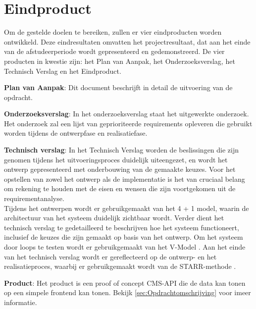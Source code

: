 \section{Eindproduct}
Om de gestelde doelen te bereiken, zullen er vier eindproducten worden ontwikkeld.
Deze eindresultaten omvatten het projectresultaat, dat aan het einde van de afstudeerperiode wordt gepresenteerd en gedemonstreerd.
De vier producten in kwestie zijn: het Plan van Aanpak, het Onderzoeksverslag, het Technisch Verslag en het Eindproduct.

\whitespace[2]
\textbf{Plan van Aanpak}: Dit document beschrijft in detail de uitvoering van de opdracht.

\whitespace[2]
\textbf{Onderzoeksverslag}: In het onderzoeksverslag staat het uitgewerkte onderzoek.
Het onderzoek zal een lijst van geprioriteerde requirements opleveren die gebruikt worden tijdens de ontwerpfase en realisatiefase.

\whitespace[2]
\textbf{Technisch verslag}: In het Technisch Verslag worden de beslissingen die zijn genomen tijdens het uitvoeringsproces duidelijk uiteengezet, en wordt het ontwerp gepresenteerd met onderbouwing van de gemaakte keuzes.
Voor het opstellen van zowel het ontwerp als de implementatie is het van cruciaal belang om rekening te houden met de eisen en wensen die zijn voortgekomen uit de requirementanalyse. \\
Tijdens het ontwerpen wordt er gebruikgemaakt van het 4 + 1 model, waarin de architectuur van het systeem duidelijk zichtbaar wordt.
Verder dient het technisch verslag te gedetailleerd te beschrijven hoe het systeem functioneert, inclusief de keuzes die zijn gemaakt op basis van het ontwerp.
Om het systeem door loops te testen wordt er gebruikgemaakt van het V-Model \Parencite{VModel}.
Aan het einde van het technisch verslag wordt er gereflecteerd op de ontwerp- en het realisatieproces, waarbij er gebruikgemaakt wordt van de STARR-methode \Parencite{STARR}.

\whitespace[2]
\textbf{Product}: Het product is een proof of concept \gls{CMS}-API die de data kan tonen op een simpele frontend kan tonen.
Bekijk \ref{sec:Opdrachtomschrijving} voor imeer informatie.
